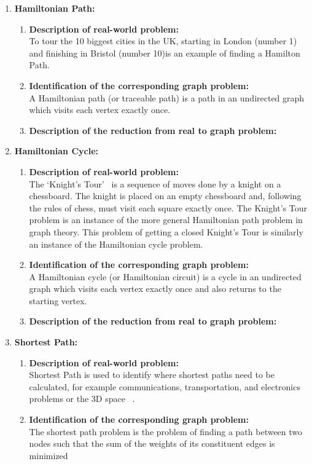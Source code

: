 \documentclass[article, 10pt,onecolumn]{article}
\begin{document}
\begin{enumerate}
\item \textbf{Hamiltonian Path:} 
\begin{enumerate}
	\item \textbf{Description of real-world problem:}\\
    To tour the 10 biggest cities in the UK, starting in London (number 1) and finishing in Bristol (number 10)is an example of finding a
    Hamilton Path.~\cite{path}
   \item \textbf{Identification of the corresponding graph problem:}\\
    A Hamiltonian path (or traceable path) is a path in an undirected graph which visits each vertex exactly once. 
   \item \textbf{Description of the reduction from real to graph problem:}\\
 \end{enumerate}  
\item \textbf{Hamiltonian Cycle:} 
\begin{enumerate}
	\item  \textbf{Description of real-world problem:}\\
    The `Knight's Tour'~\cite{knight} is a sequence of moves done by a knight on a chessboard. The knight is placed on an empty chessboard
    and, following the rules of chess, must visit each square exactly once. The Knight's Tour problem is an instance of the more general
    Hamiltonian path problem in graph theory. This problem of getting a closed Knight's Tour is similarly an instance of the Hamiltonian
    cycle problem.
   \item \textbf{Identification of the corresponding graph problem:}\\
    A Hamiltonian cycle (or Hamiltonian circuit) is a cycle in an undirected graph which visits each vertex exactly once and also returns to the starting vertex.
   \item \textbf{Description of the reduction from real to graph problem:}\\
  \end{enumerate}  
\item \textbf{Shortest Path:} 
\begin{enumerate}   
   \item \textbf{Description of real-world problem:}\\
    Shortest Path is used to identify where shortest paths need to be calculated, for example communications, transportation, and electronics
    problems or the 3D space ~\cite{Mobile}.
   \item \textbf{Identification of the corresponding graph problem:}\\
    The shortest path problem is the problem of finding a path between two nodes such that the sum of the weights of its constituent edges
    is minimized
\end{enumerate}
 

\end{enumerate}
\end{document}
